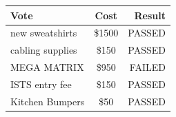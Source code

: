 \documentclass[9pt]{extarticle} %
\begin{document}
\begin{minipage}[t]{.35\linewidth}
\begin{mdframed}[style=sidebar,frametitle={}]
\begin{tabular}{lcr}

Vote & Cost & Result \\
\midrule
new sweatshirts & \$1500 & PASSED \\
cabling supplies & \$150 & PASSED \\
MEGA MATRIX & \$950 & FAILED \\
ISTS entry fee & \$150 & PASSED \\
Kitchen Bumpers & \$50 & PASSED \\ 
\bottomrule
\end{tabular}


\end{mdframed}
\end{minipage}\hfill %
%
%
\end{document}
